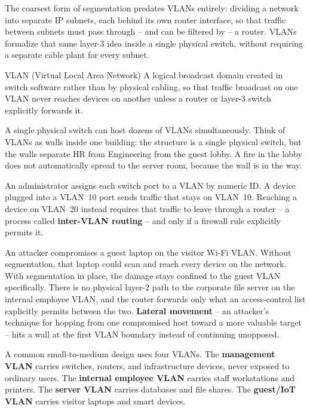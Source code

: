 The coarsest form of segmentation predates VLANs entirely: dividing a network into separate IP
subnets, each behind its own router interface, so that traffic between subnets must pass through
-- and can be filtered by -- a router. VLANs formalize that same layer-3 idea inside a single
physical switch, without requiring a separate cable plant for every subnet.

\begin{definition}{VLAN (Virtual Local Area Network)}
A logical broadcast domain created in switch software rather than by physical cabling, so that
traffic broadcast on one VLAN never reaches devices on another unless a router or layer-3 switch
explicitly forwards it.
\end{definition}

A single physical switch can host dozens of VLANs simultaneously. Think of VLANs as walls inside
one building: the structure is a single physical switch, but the walls separate HR from
Engineering from the guest lobby. A fire in the lobby does not automatically spread to the server
room, because the wall is in the way.

An administrator assigns each switch port to a VLAN by numeric ID. A device plugged into a
VLAN~10 port sends traffic that stays on VLAN~10. Reaching a device on VLAN~20 instead requires
that traffic to leave through a router -- a process called \textbf{inter-VLAN routing} -- and only
if a firewall rule explicitly permits it.

\begin{example}
An attacker compromises a guest laptop on the visitor Wi-Fi VLAN. Without segmentation, that laptop
could scan and reach every device on the network. With segmentation in place, the damage stays
confined to the guest VLAN specifically. There is no physical layer-2 path to the corporate file
server on the internal employee VLAN, and the router forwards only what an access-control list
explicitly permits between the two. \textbf{Lateral movement} -- an attacker's technique for
hopping from one compromised host toward a more valuable target -- hits a wall at the first VLAN
boundary instead of continuing unopposed.
\end{example}

A common small-to-medium design uses four VLANs. The \textbf{management VLAN} carries switches,
routers, and infrastructure devices, never exposed to ordinary users. The \textbf{internal employee
VLAN} carries staff workstations and printers. The \textbf{server VLAN} carries databases and file
shares. The \textbf{guest/IoT VLAN} carries visitor laptops and smart devices.

